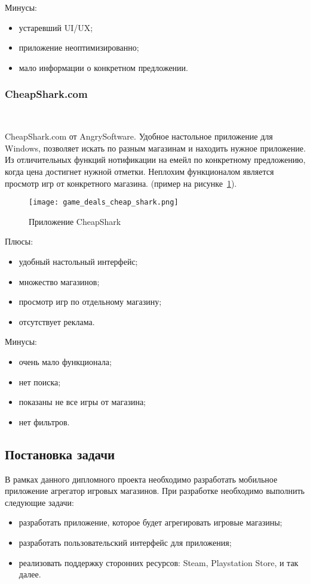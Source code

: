 Минусы:
\begin{itemize}
 \item устаревший UI/UX;
 \item приложение неоптимизированно;
 \item мало информации о конкретном предложении.
\end{itemize}

\subsubsection{CheapShark.com}~\par
CheapShark.com от AngrySoftware. Удобное настольное приложение для Windows, позволяет искать по разным магазинам и находить нужное приложение. Из отличительных функций нотификации на емейл по конкретному предложению, когда цена достигнет нужной отметки. Неплохим функционалом является просмотр игр от конкретного магазина. (пример на рисунке~\ref{fig:domain:game_cheap_shark}).

\begin{figure}[H]
  \centering
    \texttt{[image: game\_deals\_cheap\_shark.png]} 
    \caption{Приложение CheapShark}
    \label{fig:domain:game_cheap_shark}
 \end{figure}

Плюсы:
\begin{itemize}
  \item удобный настольный интерфейс;
  \item множество магазинов;
  \item просмотр игр по отдельному магазину;
  \item отсутствует реклама.
\end{itemize}

 Минусы:
 \begin{itemize}
  \item очень мало функционала;
  \item нет поиска;
  \item показаны не все игры от магазина;
  \item нет фильтров.
\end{itemize}
 
\subsection{Постановка задачи}
В рамках данного дипломного проекта необходимо разработать мобильное приложение агрегатор игровых магазинов. При разработке необходимо выполнить следующие задачи:
\begin{itemize}
 \item разработать приложение, которое будет агрегировать игровые магазины;
 \item разработать пользовательский интерфейс для приложения;
 \item реализовать поддержку сторонних ресурсов: Steam, Playstation Store, и так далее.
\end{itemize}
 
